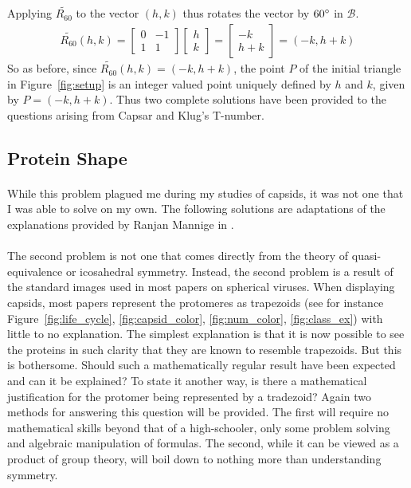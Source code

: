 \documentclass[12pt,letter]{article}
\begin{document}
%
Applying $\widetilde{R_{60}}$ to the vector $(h,k)$ thus rotates the vector by $60\degree$ in $\mathcal{B}$.
%
\begin{align*}
	\widetilde{R_{60}}(h,k) =
	\begin{bmatrix}
		0 & -1 \\
		1 & 1
	\end{bmatrix}
	\begin{bmatrix}
		h \\ k
	\end{bmatrix} = 
	\begin{bmatrix}
		-k \\ h + k
	\end{bmatrix} =
	(-k , h + k)
\end{align*}
So as before, since $\widetilde{R_{60}}(h,k) = (-k , h + k)$, the point $P$ of the initial triangle in Figure~\ref{fig:setup} is an integer valued point uniquely defined by $h$ and $k$, given by $P = (-k , h + k)$. Thus two complete solutions have been provided to the questions arising from Capsar and Klug's T-number.

\subsection{Protein Shape}
\paragraph{}
While this problem plagued me during my studies of capsids, it was not one that I was able to solve on my own. The following solutions are adaptations of the explanations provided by Ranjan Mannige in \cite[p 5-7]{Mannige:2009}.
\paragraph{}
The second problem is not one that comes directly from the theory of quasi-equivalence or icosahedral symmetry. Instead, the second problem is a result of the standard images used in most papers on spherical viruses. When displaying capsids, most papers represent the protomeres as trapezoids (see for instance Figure~\ref{fig:life_cycle}, \ref{fig:capsid_color}, \ref{fig:num_color}, \ref{fig:class_ex}) with little to no explanation. The simplest explanation is that it is now possible to see the proteins in such clarity that they are known to resemble trapezoids. But this is bothersome. Should such a mathematically regular result have been expected and can it be explained? To state it another way, is there a mathematical justification for the protomer being represented by a tradezoid? Again two methods for answering this question will be provided. The first will require no mathematical skills beyond that of a high-schooler, only some problem solving and algebraic manipulation of formulas. The second, while it can be viewed as a product of group theory, will boil down to nothing more than understanding symmetry.
\end{document}

